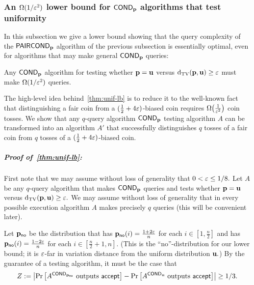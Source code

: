 \subsubsection{An \texorpdfstring{$\Omega(1/\varepsilon^2)$}{Omega(1/eps2)} lower bound for \texorpdfstring{${\sf COND}_{\mathbf{p}}$}{COND} algorithms that test uniformity} \label{ssec:unif-lb}

In this subsection we give a lower bound showing that
the query complexity of the ${\sf PAIRCOND}_{\mathbf{p}}$ algorithm
of the previous subsection is essentially optimal, even for
algorithms that may make general ${\sf COND}_{\mathbf{p}}$ queries:

\begin{theorem} \label{thm:unif-lb}
Any ${\sf COND}_{\mathbf{p}}$ algorithm for testing whether $\mathbf{p} = \mathbf{u}$
versus $\operatorname{d}_{\rm{TV}}(\mathbf{p},\mathbf{u}) \geq \varepsilon$ must make $\Omega(1/\varepsilon^2)$
queries.
\end{theorem}

The high-level idea behind~\cref{thm:unif-lb} is to
reduce it to the well-known fact that distinguishing a fair coin
from a $(\frac{1}{2} + 4\varepsilon)$-biased coin requires $\bigOmega{\frac{1}{\eps^2}}$
coin tosses.  We show that any $q$-query algorithm ${\sf COND}_{\mathbf{p}}$ testing
algorithm $A$ can be transformed into an algorithm $A'$ that successfully
distinguishes $q$ tosses of a fair coin from $q$ tosses of a
$(\frac{1}{2} + 4 \varepsilon)$-biased coin.

\medskip

\subparagraph{Proof of~\cref{thm:unif-lb}:}
First note that
we may assume without loss of generality that $0 < \varepsilon \leq 1/8.$
Let $A$ be any $q$-query algorithm that makes ${\sf COND}_{\mathbf{p}}$ queries
and tests whether $\mathbf{p} = \mathbf{u}$ versus $\operatorname{d}_{\rm{TV}}(\mathbf{p},\mathbf{u}) \geq \varepsilon.$
We may assume without loss of generality that in every possible
execution algorithm $A$ makes precisely $q$ queries (this will be
convenient later).

Let $\mathbf{p}_{\text {\textsf{no}}}$ be the distribution that has $\mathbf{p}_{\text {\textsf{no}}}(i)=
\frac{1+2\varepsilon}{n}$ for each $i \in \left[1,\frac{n}{2}\right]$ and
has $\mathbf{p}_{\text {\textsf{no}}}(i) = \frac{1-2\varepsilon}{n}$ for
each $i \in \left[\frac{n}{2}+1, n\right].$
(This is the ``no''-distribution for our lower bound; it is
$\varepsilon$-far in variation
distance from the uniform distribution $\mathbf{u}.$)
By the guarantee of a testing algorithm, it must be the case
that
\[
Z := \left|
\Pr\left[A^{{\sf COND}_{\mathbf{p}_{\text {\textsf{no}}}}} \text{~outputs~}\textsf{accept}\right] -
\Pr\left[A^{{\sf COND}_{\mathbf{u}}} \text{~outputs~}\textsf{accept}\right]
\right| \geq 1/3.
\]

